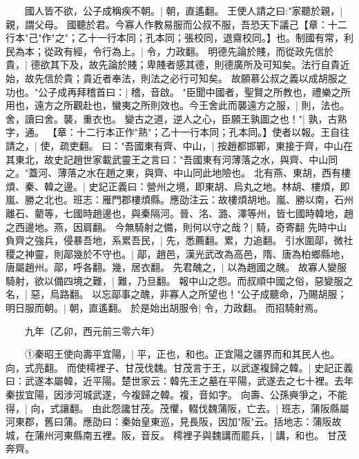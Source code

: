　　國人皆不欲，公子成稱疾不朝。|{
	朝，直遙翻。
	}
王使人請之曰:"家聽於親，|{
	親，謂父母。
	}
國聽於君。今寡人作教易服而公叔不服，吾恐天下議己【章：十二行本"己"作"之"；乙十一行本同；孔本同；張校同，退齋校同。】也。制國有常，利民為本；從政有經，令行為上。|{
	令，力政翻。
	}
明德先論於賤，而從政先信於貴，|{
	德欲其下及，故先論於賤；卑賤者感其德，則德廣所及可知矣。法行自貴近始，故先信於貴；貴近者奉法，則法之必行可知矣。
	}
故願慕公叔之義以成胡服之功也。"公子成再拜稽首曰：|{
	稽，音啟。
	}
"臣聞中國者，聖賢之所教也，禮樂之所用也，遠方之所觀赴也，蠻夷之所則效也。今王舍此而襲遠方之服，|{
	則，法也。舍，讀曰舍。襲，重衣也。
	}
變古之道，逆人之心，臣願王孰圖之也！"|{
	孰，古熟字，通。
	}
【章：十二行本正作"熟"；乙十一行本同；孔本同。】使者以報。王自往請之，|{
	使，疏吏翻。
	}
曰："吾國東有齊、中山，|{
	按趙都邯鄲，東接于齊，中山在其東北，故史記趙世家載武靈王之言曰："吾國東有河薄落之水，與齊、中山同之。"蓋河、薄落之水在趙之東，與齊、中山同此地險也。
	}
北有燕、東胡，西有樓煩、秦、韓之邊。|{
	史記正義曰：營州之境，即東胡、烏丸之地。林胡、樓煩，即嵐、勝之北也。班志：雁門郡樓煩縣。應劭注云：故樓煩胡地。嵐、勝以南，石州離石、藺等，七國時趙邊也，與秦隔河。晉、洺、潞、澤等州，皆七國時韓地，趙之西邊地。燕，因肩翻。
	}
今無騎射之備，則何以守之哉？|{
	騎，奇寄翻
	}
先時中山負齊之強兵，侵暴吾地，系累吾民，|{
	先，悉薦翻。累，力追翻。
	}
引水圍鄗，微社稷之神靈，則鄗幾於不守也。|{
	鄗，趙邑，漢光武改為高邑，隋、唐為柏鄉縣地，唐屬趙州。鄗，呼各翻。幾，居衣翻。
	}
先君醜之，|{
	以為趙國之醜。
	}
故寡人變服騎射，欲以備四境之難，|{
	難，乃旦翻。
	}
報中山之怨。而叔順中國之俗，惡變服之名，|{
	惡，烏路翻。
	}
以忘鄗事之醜，非寡人之所望也！"公子成聽命，乃賜胡服；明日服而朝。|{
	朝，直遙翻。
	}
於是始出胡服令|{
	令，力政翻。
	}
而招騎射焉。

　　九年（乙卯，西元前三零六年）

　　①秦昭王使向壽平宜陽，|{
	平，正也，和也。正宜陽之疆界而和其民人也。向，式亮翻。
	}
而使樗裡子、甘茂伐魏。甘茂言于王，以武遂複歸之韓。|{
	史記正義曰：武遂本屬韓，近平陽。楚世家云：韓先王之墓在平陽，武遂去之七十裡。去年秦拔宜陽，因涉河城武遂，今複歸之韓。複，音如字。
	}
向壽、公孫奭爭之，不能得，|{
	向，式讓翻。
	}
由此怨讒甘茂。茂懼，輟伐魏蒲阪，亡去。|{
	班志，蒲阪縣屬河東郡，舊曰蒲。應劭曰：秦始皇東巡，見長阪，因加"阪"云。括地志：蒲阪故城，在蒲州河東縣南五裡。阪，音反。
	}
樗裡子與魏講而罷兵，|{
	講，和也。
	}
甘茂奔齊。

